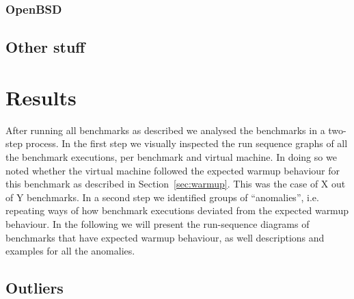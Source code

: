 \documentclass[10pt,preprint]{sigplanconf}
\begin{document}
\subsubsection{OpenBSD}



\subsection{Other stuff}



\section{Results}
\label{sec:Results}

After running all benchmarks as described we analysed the benchmarks in a
two-step process. In the first step we visually inspected the run sequence
graphs of all the benchmark executions, per benchmark and virtual machine. In
doing so we noted whether the virtual machine followed the expected warmup
behaviour for this benchmark as described in Section~\ref{sec:warmup}. This was
the case of  X out of Y benchmarks. In a second step we
identified groups of ``anomalies'', i.e. repeating ways of how benchmark
executions deviated from the expected warmup behaviour. In the following we will
present the run-sequence diagrams of benchmarks that have expected warmup
behaviour, as well descriptions and examples for all the anomalies.







\subsection{Outliers}
\label{sub:outliers}
\end{document}

